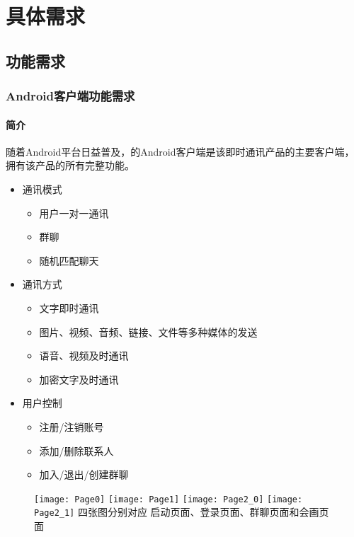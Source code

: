 \chapter{具体需求}
\iffalse
<The following sections must be repeated for each requirement. >

在每一条需求描述中重复下列部分
\fi
\section{功能需求}
\iffalse
This section describes how the input of the software is translated to the output. It describes the essential action the software must perform.

For each kind of function, or each independent function in some cases, the requirements of input, process and output must be described, which are usually organized with the following four subsections:

本子章节应描述软件产品的输入怎样被转换成输出。它描述了软件必须执行的基本动作。 

对每一类功能或有时对每一个单独的功能，必须描述输入、处理、输出方面的需求。这些通常以下面四个子段落来组织：
\fi
\subsection{Android客户端功能需求}
\subsubsection{简介}
随着Android平台日益普及，的Android客户端是该即时通讯产品的主要客户端，拥有该产品的所有完整功能。
\begin{itemize}
\item 通讯模式
  \begin{itemize}  	
  	\item 用户一对一通讯
  	\item 群聊
  	\item 随机匹配聊天
  \end{itemize}
\item 通讯方式
  \begin{itemize}
  	\item 文字即时通讯
  	\item 图片、视频、音频、链接、文件等多种媒体的发送
  	\item 语音、视频及时通讯
  	\item 加密文字及时通讯
  \end{itemize}
\item 用户控制
  \begin{itemize}
  	\item 注册/注销账号
  	\item 添加/删除联系人
  	\item 加入/退出/创建群聊
  \end{itemize}
\end{itemize}
  \begin{figure}[!h]
	\texttt{[image: Page0]}
	\texttt{[image: Page1]}
	\texttt{[image: Page2\_0]}
	\texttt{[image: Page2\_1]}
	四张图分别对应 启动页面、登录页面、群聊页面和会画页面
	\label{fig:noted-figure}
   \end{figure}

